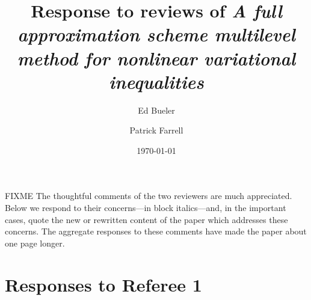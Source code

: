 \documentclass[letterpaper,final,12pt,reqno]{amsart}
\begin{document}
\title{Response to reviews of \emph{A full approximation scheme multilevel method for nonlinear variational inequalities}}

\author{Ed Bueler}

\author{Patrick Farrell}

\date{\today}

\maketitle


\thispagestyle{empty}

FIXME The thoughtful comments of the two reviewers are much appreciated.  Below we respond to their concerns---in block italics---and, in the important cases, quote the new or rewritten content of the paper which addresses these concerns.  The aggregate responses to these comments have made the paper about one page longer.


\section{Responses to Referee 1}

\end{document}
